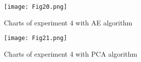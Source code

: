 \documentclass[11pt]{article}
\begin{document}
	\begin{figure}[h]
		\centering
		\texttt{[image: Fig20.png]}
		\caption{Charts of experiment 4 with AE algorithm}
	\end{figure}
	
	\begin{figure}[hb]
		\centering
		\texttt{[image: Fig21.png]}
		\caption{Charts of experiment 4 with PCA algorithm}
	\end{figure}
	
	\begin{landscape}
		
		\begin{table}[t]
			\centering
			\caption{Results of experiment 4—comparison of AE and PCA with varying user counts}
\end{table}
\end{landscape}
\end{document}
